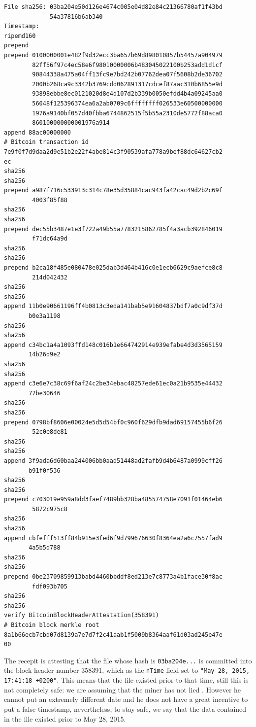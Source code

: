 \begin{Verbatim}[frame=single]
File sha256: 03ba204e50d126e4674c005e04d82e84c21366780af1f43bd
             54a37816b6ab340
Timestamp:
ripemd160
prepend
prepend 0100000001e482f9d32ecc3ba657b69d898010857b54457a904979
        82ff56f97c4ec58e6f98010000006b483045022100b253add1d1cf
        90844338a475a04ff13fc9e7bd242b07762dea07f5608b2de36702
        2000b268ca9c3342b3769cdd062891317cdcef87aac310b6855e9d
        93898ebbe8ec0121020d8e4d107d2b339b0050efdd4b4a09245aa0
        56048f125396374ea6a2ab0709c6ffffffff026533e60500000000
        1976a9140bf057d40fbba6744862515f5b55a2310de5772f88aca0
        860100000000001976a914
append 88ac00000000
# Bitcoin transaction id
7e9f0f7d9daa2d9e51b2e22f4abe814c3f90539afa778a9bef88dc64627cb2
ec
sha256
sha256
prepend a987f716c533913c314c78e35d35884cac943fa42cac49d2b2c69f
        4003f85f88
sha256
sha256
prepend dec55b3487e1e3f722a49b55a7783215862785f4a3acb392846019
        f71dc64a9d
sha256
sha256
prepend b2ca18f485e080478e025dab3d464b416c0e1ecb6629c9aefce8c8
        214d042432
sha256
sha256
append 11b0e90661196ff4b0813c3eda141bab5e91604837bdf7a0c9df37d
       b0e3a1198
sha256
sha256
append c34bc1a4a1093ffd148c016b1e664742914e939efabe4d3d3565159
       14b26d9e2
sha256
sha256
append c3e6e7c38c69f6af24c2be34ebac48257ede61ec0a21b9535e44432
       77be30646
sha256
sha256
prepend 0798bf8606e00024e5d5d54bf0c960f629dfb9dad69157455b6f26
        52c0e8de81
sha256
sha256
append 3f9ada6d60baa244006bb0aad51448ad2fafb9d4b6487a0999cff26
       b91f0f536
sha256
sha256
prepend c703019e959a8dd3faef7489bb328ba485574758e7091f01464eb6
        5872c975c8
sha256
sha256
append cbfefff513ff84b915e3fed6f9d799676630f8364ea2a6c7557fad9
       4a5b5d788
sha256
sha256
prepend 0be23709859913babd4460bbddf8ed213e7c8773a4b1face30f8ac
        fdf093b705
sha256
sha256
verify BitcoinBlockHeaderAttestation(358391)
# Bitcoin block merkle root
8a1b66ecb7cbd07d8139a7e7d7f2c41aab1f5009b8364aaf61d03ad245e47e
00
\end{Verbatim}
The recepit is attesting that the file whose hash is \verb|03ba204e...| is committed into the block header number 358391, which as the \verb|nTime| field set to \verb|"May 28, 2015, 17:41:18 +0200"|. This means that the file existed prior to that time, still this is not completely safe: we are assuming that the miner has not lied \cite{TimeInaccuracy}. However he cannot put an extremely different date and he does not have a great incentive to put a false timestamp, nevertheless, to stay safe, we say that the data contained in the file existed prior to May 28, 2015.

